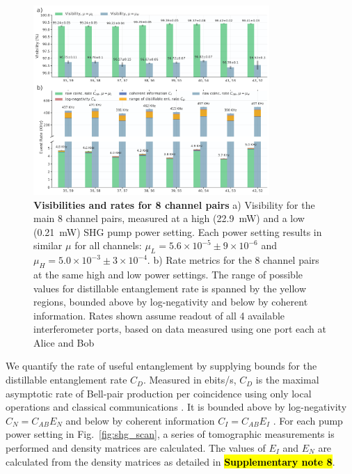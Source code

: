 \documentclass[11pt]{caltech_thesis} %
\begin{document}
\hypertarget{fig:channel_data}{%
\begin{figure}
\centering
\includegraphics[width=0.8\textwidth,height=\textheight]{./chapter_05/figs/8ch_bar_graph_high_power_light.pdf}
\caption[{Visibilities and rates for 8 channel pairs}]{\textbf{Visibilities and rates for 8 channel pairs} a) Visibility for the main 8 channel pairs, measured at a high (22.9~mW) and a low (0.21~mW) SHG pump power setting. Each power setting results in similar $\mu$ for all channels: $\mu_L = 5.6{\times}10^{-5} \pm 9{\times}10^{-6}$ and $\mu_H = 5.0{\times}10^{-3} \pm 3{\times}10^{-4}$. b) Rate metrics for the 8 channel pairs at the same high and low power settings. The range of possible values for distillable entanglement rate is spanned by the yellow regions, bounded above by log-negativity and below by coherent information. Rates shown assume readout of all 4 available interferometer ports, based on data measured using one port each at Alice and Bob}
\label{fig:channel_data}
\end{figure}
}

We quantify the rate of useful entanglement by supplying bounds for the distillable entanglement rate $C_D$. Measured in ebits/s, $C_D$ is the maximal asymptotic rate of Bell-pair production per coincidence using only local operations and classical communications \autocite{Alshowkan2022,Bennett1996}. It is bounded above by log-negativity $C_N = C_{AB} E_N$ and below by coherent information $C_I = C_{AB} E_I$ \autocite{Alshowkan2022}. For each pump power setting in Fig.~\ref{fig:shg_scan}, a series of tomographic measurements is performed and density matrices are calculated. The values of $E_I$ and $E_N$ are calculated from the density matrices as detailed in \textbf{\hl{Supplementary note 8}}.
\end{document}
